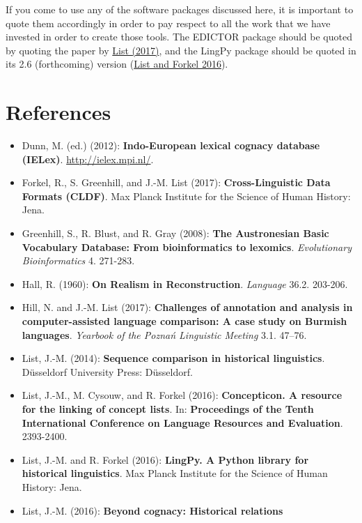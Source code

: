 \documentclass[a4paper,svgnames]{scrartcl}
\providecommand{\tightlist}{%
  \setlength{\itemsep}{0pt}\setlength{\parskip}{0pt}}
\begin{document}
If you come to use any of the software packages discussed here, it is
important to quote them accordingly in order to pay respect to all the
work that we have invested in order to create those tools. The EDICTOR
package should be quoted by quoting the paper by
\href{http://bibliography.lingpy.org?key=List2017d}{List (2017)}, and
the LingPy package should be quoted in its 2.6 (forthcoming) version
(\href{http://bibliography.lingpy.org?key=List2016e}{List and Forkel
2016}).

\section{References}\label{references}

\begin{itemize}
\tightlist
\item
  Dunn, M. (ed.) (2012): \textbf{Indo-European lexical cognacy database
  (IELex)}. \href{”http://ielex.mpi.nl/”}{http://ielex.mpi.nl/}.
\item
  Forkel, R., S. Greenhill, and J.-M. List (2017):
  \textbf{Cross-Linguistic Data Formats (CLDF)}. Max Planck Institute
  for the Science of Human History: Jena.
\item
  Greenhill, S., R. Blust, and R. Gray (2008): \textbf{The Austronesian
  Basic Vocabulary Database: From bioinformatics to lexomics}.
  \emph{Evolutionary Bioinformatics} 4. 271-283.
\item
  Hall, R. (1960): \textbf{On Realism in Reconstruction}.
  \emph{Language} 36.2. 203-206.
\item
  Hill, N. and J.-M. List (2017): \textbf{Challenges of annotation and
  analysis in computer-assisted language comparison: A case study on
  Burmish languages}. \emph{Yearbook of the Poznań Linguistic Meeting}
  3.1. 47--76.
\item
  List, J.-M. (2014): \textbf{Sequence comparison in historical
  linguistics}. Düsseldorf University Press: Düsseldorf.
\item
  List, J.-M., M. Cysouw, and R. Forkel (2016): \textbf{Concepticon. A
  resource for the linking of concept lists}. In: \textbf{Proceedings of
  the Tenth International Conference on Language Resources and
  Evaluation}. 2393-2400.
\item
  List, J.-M. and R. Forkel (2016): \textbf{LingPy. A Python library for
  historical linguistics}. Max Planck Institute for the Science of Human
  History: Jena.
\item
  List, J.-M. (2016): \textbf{Beyond cognacy: Historical relations
}
\end{itemize}
\end{document}
